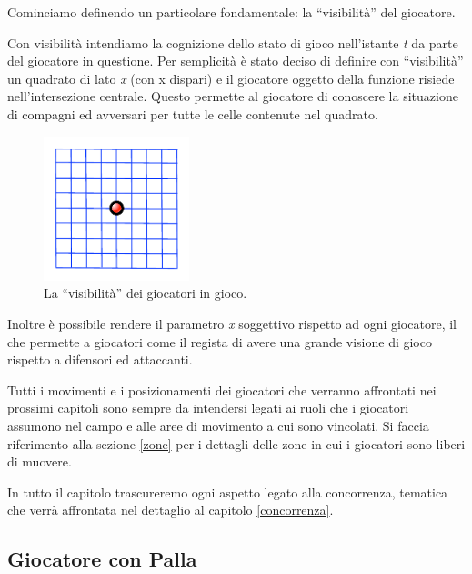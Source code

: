 \documentclass[aps,letterpaper,10pt]{article}
\begin{document}
Cominciamo definendo un particolare fondamentale: la ``visibilit\`a'' del giocatore. \vspace{3mm}

Con visibilit\`a intendiamo la cognizione dello stato di gioco nell'istante \emph{t} da parte del giocatore in
questione. Per semplicit\`a \`e stato deciso di definire con ``visibilit\`a'' un quadrato di lato \emph{x} (con x
dispari) e il giocatore oggetto della funzione risiede nell'intersezione centrale. Questo permette al giocatore di
conoscere la situazione di compagni ed avversari per tutte le celle contenute nel quadrato. \vspace{3mm}

\begin{figure}[H]
	\begin{center}
		\includegraphics[width=160px]{images/vision.pdf}
	\end{center}
\caption{La ``visibilit\`a'' dei giocatori in gioco.}
\end{figure}

Inoltre \`e possibile rendere il parametro \emph{x} soggettivo rispetto ad ogni giocatore, il che permette a giocatori
come il regista di avere una grande visione di gioco rispetto a difensori ed attaccanti. \vspace{3mm}

Tutti i movimenti e i posizionamenti dei giocatori che verranno affrontati nei prossimi capitoli sono sempre da
intendersi legati ai ruoli che i giocatori assumono nel campo e alle aree di movimento a cui sono vincolati. Si faccia
riferimento alla sezione \ref{zone} per i dettagli delle zone in cui i giocatori sono liberi di muovere. \vspace{3mm}

In tutto il capitolo trascureremo ogni aspetto legato alla concorrenza, tematica che verr\`a affrontata nel dettaglio al
capitolo \ref{concorrenza}.

\subsection{Giocatore con Palla}
\end{document}
